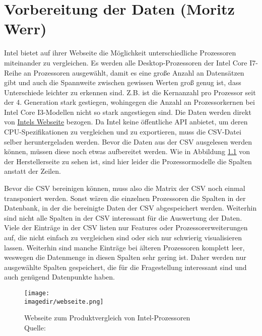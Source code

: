 \chapter{Vorbereitung der Daten (Moritz Werr)}

Intel bietet auf ihrer Webseite die Möglichkeit unterschiedliche Prozessoren miteinander zu vergleichen.
Es werden alle Desktop-Prozessoren der Intel Core I7-Reihe an Prozessoren ausgewählt, damit es eine große Anzahl an Datensätzen gibt und auch die Spannweite zwischen gewissen Werten groß genug ist, dass Unterschiede leichter zu erkennen sind.
Z.B. ist die Kernanzahl pro Prozessor seit der 4. Generation stark gestiegen, wohingegen die Anzahl an Prozessorkernen bei Intel Core I3-Modellen nicht so stark angestiegen sind.
Die Daten werden direkt von \href{https://www.intel.de/content/www/de/de/products/compare.html?productIds=212279,212280,212047,212048,212251,199325,199335,199314,199316,199318,191048,191792,193738,190885,186604,148263,140642,126684,97129,93339,88200,88195,87718,88040,80807,80808,80809,80814,80806,77656,76642,75121,75122,75123,75124,75125,236781,236794,236854,236783,236789,230492,230490,230491,230500,230489,134596,134591,134592,134594,134595,129948,126686,97122,97128,88196}{Intels Webseite} bezogen.
Da Intel keine öffentliche API anbietet, um deren CPU-Spezifikationen zu vergleichen und zu exportieren, muss die CSV-Datei selber heruntergeladen werden. 
Bevor die Daten aus der CSV ausgelesen werden können, müssen diese noch etwas aufbereitet werden.
Wie in Abbildung \ref{fig:intel_webseite} von der Herstellerseite zu sehen ist, sind hier leider die Prozessormodelle die Spalten anstatt der Zeilen. 


Bevor die CSV bereinigen können, muss also die  Matrix der CSV noch einmal transponiert werden.
Sonst wären die einzelnen Prozessoren die Spalten in der Datenbank, in der die bereinigte Daten der CSV abgespeichert werden.
Weiterhin sind nicht alle Spalten in der CSV interessant für die Auswertung der Daten.
Viele der Einträge in der CSV listen nur Features oder Prozessorerweiterungen auf, die nicht einfach zu vergleichen sind oder sich nur schwierig visualisieren lassen.
Weiterhin sind manche Einträge bei älteren Prozessoren komplett leer, weswegen die Datenmenge in diesen Spalten sehr gering ist.
Daher werden nur ausgewählte Spalten gespeichert, die für die Fragestellung interessant sind und auch genügend Datenpunkte haben.

\cleardoublepage

\begin{figure}
	\centering 
	\texttt{[image: \\imagedir/webseite.png]} 
	\captionsetup{format=hang}
	\caption[Webseite von Intel]{\label{fig:intel_webseite}Webseite zum Produktvergleich von Intel-Prozessoren \\Quelle: \cite{i7_intel_2024}}
\end{figure}

